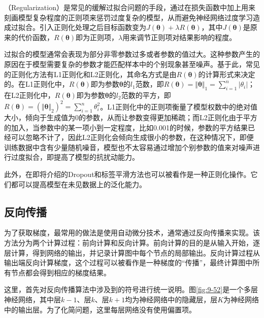 （Regularization）是常见的缓解过拟合问题的手段，通过在损失函数中加上用来刻画模型复杂程度的正则项来惩罚过度复杂的模型，从而避免神经网络过度学习造成过拟合。引入正则化处理之后目标函数变为$ J({\bm \theta})+\lambda R({\bm \theta}) $，其中$ J({\bm \theta}) $是原来的代价函数，$ R({\bm \theta}) $即为正则项，$ \lambda $用来调节正则项对结果影响的程度。

\parinterval  过拟合的模型通常会表现为部分非零参数过多或者参数的值过大。这种参数产生的原因在于模型需要复杂的参数才能匹配样本中的个别现象甚至噪声。基于此，常见的正则化方法有L1正则化和L2正则化，其命名方式是由$ R({\bm \theta}) $的计算形式来决定的。在L1正则化中，$ R({\bm \theta}) $即为参数$ {\bm \theta} $的$ l_1 $范数，即$ R({\bm \theta}) ={\Vert {\bm \theta}\Vert}_1=\sum\limits_{i=1}^{n}{\vert \theta_i\vert} $；在L2正则化中，$ R(\bm \theta) $即为参数${\bm \theta} $的$ l_2 $范数的平方，即$ R(\bm \theta) =({\Vert {\bm \theta}\Vert}_2)^2=\sum\limits_{i=1}^{n}{\theta_i^2} $。L1正则化中的正则项衡量了模型权数中的绝对值大小，倾向于生成值为0的参数，从而让参数变得更加稀疏；而L2正则化由于平方的加入，当参数中的某一项小到一定程度，比如0.001的时候，参数的平方结果已经可以忽略不计了，因此L2正则化会倾向生成很小的参数，在这种情况下，即便训练数据中含有少量随机噪音，模型也不太容易通过增加个别参数的值来对噪声进行过度拟合，即提高了模型的抗扰动能力。

\parinterval  此外，在{\chaptertwelve}即将介绍的Dropout和标签平滑方法也可以被看作是一种正则化操作。它们都可以提高模型在未见数据上的泛化能力。


\subsection{反向传播}\label{sec:9.4.6}

\parinterval  为了获取梯度，最常用的做法是使用自动微分技术，通常通过反向传播来实现。该方法分为两个计算过程：前向计算和反向计算。前向计算的目的是从输入开始，逐层计算，得到网络的输出，并记录计算图中每个节点的局部输出。反向计算过程从输出端反向计算梯度，这个过程可以被看作是一种梯度的“传播”，最终计算图中所有节点都会得到相应的梯度结果。

\parinterval  这里，首先对反向传播算法中涉及到的符号进行统一说明。图\ref{fig:9-52}是一个多层神经网络，其中层$ k-1 $、层$ k $、层$ k+1 $均为神经网络中的隐藏层，层$ K $为神经网络中的输出层。为了化简问题，这里每层网络没有使用偏置项。


